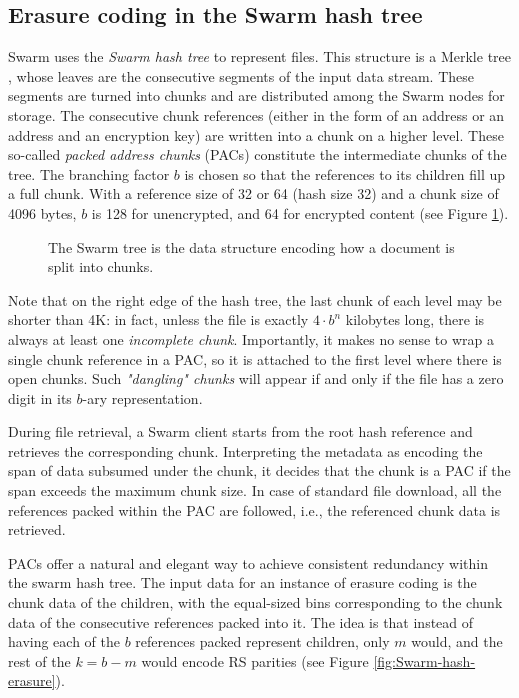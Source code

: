 \subsection{Erasure coding in the Swarm hash tree \statusgreen}
\label{sec:erasure-bmt}

Swarm uses the \emph{Swarm hash tree} to represent files. This structure is a Merkle tree \citep{merkle1980protocols}, whose leaves are the consecutive segments of the input data stream. These segments are turned into chunks and are distributed among the Swarm nodes for storage. The consecutive chunk references (either in the form of an address or an address and an encryption key) are written into a chunk on a higher level.
These so-called \emph{packed address chunks} (PACs) constitute the intermediate chunks of the tree.
The branching factor $b$ is chosen so that the references to its children fill up a full chunk.
With a reference size of 32 or 64 (hash size 32) and a chunk size of 4096 bytes, $b$ is 128 for unencrypted, and 64 for encrypted content 
(see Figure \ref{fig:Swarm-hash-split}).


\begin{figure}[!ht]
   \centering
   
   \caption[Swarm hash split \statusgreen]{The Swarm tree is the data structure encoding how a document is split into chunks.}
   \label{fig:Swarm-hash-split}
\end{figure}

Note that on the right edge of the hash tree, the last chunk of each level may be shorter than 4K: in fact, unless the file is exactly $4\cdot b^n$ kilobytes long, there is always at least one \emph{incomplete chunk}.  Importantly, it makes no sense to wrap a single chunk reference in a PAC, so it is attached to the first level where there is open chunks. Such \emph{"dangling" chunks} will appear if and only if the file has a zero digit in its $b$-ary representation. 

During file retrieval, a Swarm client starts from the root hash reference and retrieves the corresponding chunk. Interpreting the metadata as encoding the span of data subsumed under the chunk, it decides that the chunk is a PAC if the span exceeds the maximum chunk size. 
In case of standard file download, all the references packed within the PAC are followed, i.e., the referenced chunk data is retrieved. 

PACs offer a natural and elegant way to achieve consistent redundancy within the swarm hash tree.
The input data for an instance of erasure coding is the chunk data of the children, with the equal-sized bins corresponding to the chunk data of the consecutive references packed into it. The idea is that instead of having each of the $b$ references packed represent children, only $m$ would, and the rest of the $k=b-m$ would encode RS parities (see Figure \ref{fig:Swarm-hash-erasure}).


